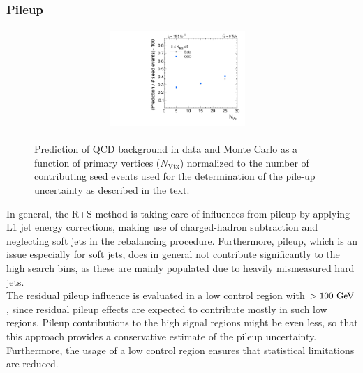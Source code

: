 \subsubsection*{Pileup} 
\begin{figure}[!t]
  \centering
  \begin{tabular}{cc}
                \includegraphics[width=0.49\textwidth]{figures/PUUncertainty_NJet3_5.pdf}%
  \end{tabular}
  \caption{Prediction of QCD background in data and Monte Carlo as a function of primary vertices ($N_\mathrm{Vtx}$) normalized to the number of contributing seed events used for the determination of the pile-up uncertainty as described in the text.}
  \label{fig:qcd_rs_pileup}
\end{figure}
In general, the R+S method is taking care of influences from pileup by applying L1 jet energy corrections, making use of charged-hadron subtraction and neglecting soft jets in the rebalancing procedure. Furthermore, pileup, which is an issue especially for soft jets, does in general not contribute significantly to the high \MHT search bins, as these are mainly populated due to heavily mismeasured hard jets. \\
The residual pileup influence is evaluated in a low \MHT control region with \MHT $> 100 \rm{~GeV}$, since residual pileup effects are expected to contribute mostly in such low \MHT regions. Pileup contributions to the high \MHT signal regions might be even less, so that this approach provides a conservative estimate of the pileup uncertainty. Furthermore, the usage of a low \MHT control region ensures that statistical limitations are reduced.\\
